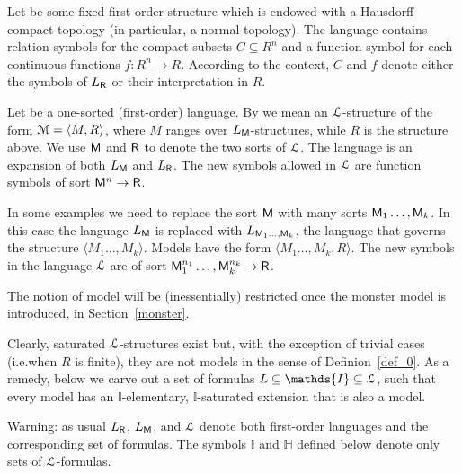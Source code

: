 \documentclass[10pt,oneside]{amsproc}
\renewcommand*{\emph}[1]{%
   \smash{\tikz[baseline]\node[rectangle, fill=teal!25, rounded corners, inner xsep=0.5ex, inner ysep=0.2ex, anchor=base, minimum height = 2.7ex]{#1};}}
\begin{document}
Let \emph{$R$\/} be some fixed first-order structure which is endowed with a Hausdorff compact topology (in particular, a normal topology).
The language \emph{$L_{\sf R}$\/} contains relation symbols for the compact subsets $C\subseteq R^n$ and a function symbol for each continuous functions $f:R^n\to R$.
According to the context, $C$ and $f$ denote either the symbols of $L_{\sf R}$ or their interpretation in $R$.


\begin{definition}\label{def_0}
  Let \emph{$L_{\sf M}$\/} be a one-sorted (first-order) language.
  By \emph{model\/} we mean an ${\EuScript L}$-structure of the form ${\EuScript M}=\langle  M,R\rangle$, where $M$ ranges over $L_{\sf M}$-structures, while $R$ is the structure above.
  We use ${\sf M}$ and ${\sf R}$ to denote the two sorts of ${\EuScript L}$.
  The language \emph{${\EuScript L}$\/} is an expansion of both $L_{\sf M}$ and $L_{\sf R}$.
  The new symbols allowed in ${\EuScript L}$ are function symbols of sort ${\sf M}^n\to {\sf R}$.
\end{definition}

In some examples we need to replace the sort ${\sf M}$ with many sorts ${\sf M}_1\dots,{\sf M}_k$.
In this case the language $L_{\sf M}$ is replaced with $L_{{\sf M}_1\dots,{\sf M}_k}$, the language that governs the structure $\langle M_1\dots,M_k\rangle$.
Models have the form $\langle M _1\dots,M_k, R\rangle$.
The new symbols in the language ${\EuScript L}$ are of sort ${\sf M}_1^{n_1}\dots,{\sf M}_k^{n_k}\to {\sf R}$.

The notion of model will be (inessentially) restricted once the monster model is introduced, in Section~\ref{monster}.

Clearly, saturated ${\EuScript L}$-structures exist but, with the exception of trivial cases (i.e.\@ when $R$ is finite), they are not models in the sense of Definion~\ref{def_0}.
As a remedy, below we carve out a set of formulas $L\subseteq\mathds{I}\subseteq {\EuScript L}$, such that every model has an $\mathds{I}$-elementary, $\mathds{I}$-saturated extension that is also a model.

Warning: as usual $L_{\sf R}$, $L_{\sf M}$, and ${\EuScript L}$ denote both first-order languages and the corresponding set of formulas.
The symbols $\mathds{I}$ and $\mathds{H}$ defined below denote only sets of ${\EuScript L}$-formulas.
\end{document}
